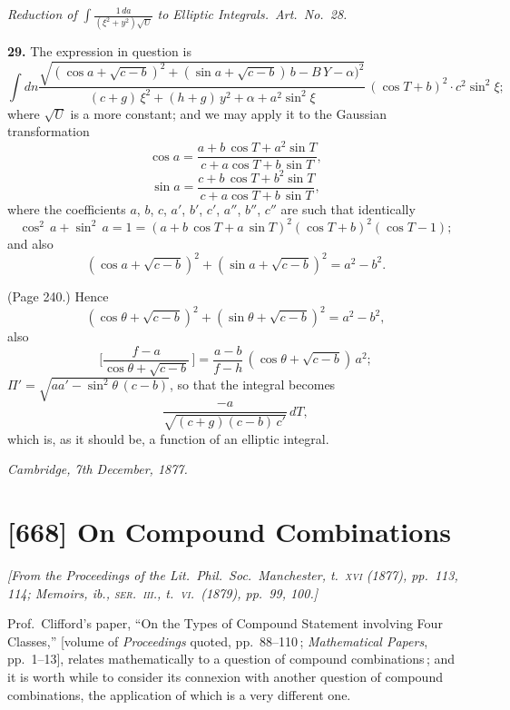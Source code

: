 \documentclass[11pt,a4paper]{article}
\theoremstyle{plain}
\theoremstyle{definition}
\begin{document}
\medskip

\noindent\textit{Reduction of} $\int \frac{1\,d a}{(\xi^2 + y^2)\sqrt{U}}$ \textit{to Elliptic Integrals.\ Art.\ No.\ 28.}

\medskip

\noindent\textbf{29.} The expression in question is
\[
\int dn \frac{\sqrt{(\cos a + \sqrt{c - b})^2 + (\sin a + \sqrt{c - b})\,b - B\,Y - \alpha)^2}}{(c + g)\,\xi^2 + (h + g)\,y^2 + \alpha + a^2 \sin^2 \xi}\,(\cos T + b)^2 \cdot c^2 \sin^2 \xi;
\]
where $\sqrt{U}$ is a more constant; and we may apply it to the Gaussian transformation
\[
\cos a = \frac{a + b\,\cos T + a^2 \sin T}{c + a\cos T + b\,\sin T},
\]
\[
\sin a = \frac{c + b\,\cos T + b^2 \sin T}{c + a \cos T + b\,\sin T},
\]
where the coefficients $a$, $b$, $c$, $a'$, $b'$, $c'$, $a''$, $b''$, $c''$ are such that identically
\[
\cos^2\,a + \sin^2\,a = 1 = (a + b\,\cos T + a\,\sin T)^2(\cos T + b)^2(\cos T - 1);
\]
and also
\[
(\cos a + \sqrt{c - b})^2 + (\sin a + \sqrt{c - b})^2 = a^2 - b^2.
\]

\medskip

\noindent (Page 240.) Hence
\[
(\cos\theta + \sqrt{c - b})^2 + (\sin\theta + \sqrt{c - b})^2 = a^2 - b^2,
\]
also
\[
\Big[\frac{f - a}{\cos\theta + \sqrt{c - b}}\,\Big] = \frac{a - b}{f - h} \,(\cos\theta + \sqrt{c - b})\,a^2;
\]
$ \Pi' = \sqrt{a a' - \sin^2 \theta\,(c - b)}$, so that the integral becomes
\[
\frac{- a}{\sqrt{(c + g)(c - b)\,c'}}\,d T,
\]
which is, as it should be, a function of an elliptic integral.

\medskip

\noindent\textit{Cambridge, 7th December, 1877.}

\bigskip

\section{[668] On Compound Combinations}
\label{sec:668}

\noindent\textit{[From the \emph{Proceedings of the Lit.\ Phil.\ Soc.\ Manchester}, t.~\textsc{xvi} (1877), pp.~113, 114; \emph{Memoirs, ib.,} \textsc{ser.\ iii.}, t.~\textsc{vi.}\ (1879), pp.\ 99, 100.]}

\medskip

\noindent Prof.\ Clifford's paper, ``On the Types of Compound Statement involving Four Classes,'' [volume of \emph{Proceedings} quoted, pp.~88--110\,; \emph{Mathematical Papers}, pp.~1--13], relates mathematically to a question of compound combinations\,; and it is worth while to consider its connexion with another question of compound combinations, the application of which is a very different one.
\end{document}
